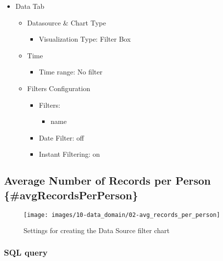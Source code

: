 \documentclass[
]{book}
\providecommand{\tightlist}{%
  \setlength{\itemsep}{0pt}\setlength{\parskip}{0pt}}
\begin{document}
\begin{itemize}
\tightlist
\item
  Data Tab

  \begin{itemize}
  \tightlist
  \item
    Datasource \& Chart Type

    \begin{itemize}
    \tightlist
    \item
      Visualization Type: Filter Box
    \end{itemize}
  \item
    Time

    \begin{itemize}
    \tightlist
    \item
      Time range: No filter
    \end{itemize}
  \item
    Filters Configuration

    \begin{itemize}
    \tightlist
    \item
      Filters:

      \begin{itemize}
      \tightlist
      \item
        name
      \end{itemize}
    \item
      Date Filter: off
    \item
      Instant Filtering: on
    \end{itemize}
  \end{itemize}
\end{itemize}

\hypertarget{average-number-of-records-per-person-avgrecordsperperson}{%
\subsection*{Average Number of Records per Person \{\#avgRecordsPerPerson\}}\label{average-number-of-records-per-person-avgrecordsperperson}}

\begin{figure}
\texttt{[image: images/10-data\_domain/02-avg\_records\_per\_person]} \caption{Settings for creating the Data Source filter chart}\label{fig:unnamed-chunk-1}
\end{figure}

\hypertarget{sql-query-26}{%
\subsubsection*{SQL query}\label{sql-query-26}}
\end{document}
